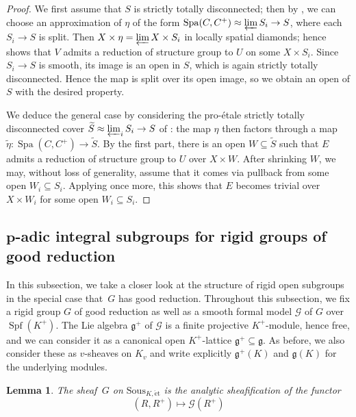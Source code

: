 \documentclass[10pt,a4paper]{article}
\newtheorem{Lemma}[thm]{Lemma}
\theoremstyle{definition}
\theoremstyle{remark}
\newcommand{\Spa}{\operatorname{Spa}}
\newcommand{\et}{{\operatorname{\acute{e}t}}}
\newcommand{\Spf}{\operatorname{Spf}}
\newcommand{\mG}{\mathcal{G}}
\newcommand{\Sous}{\mathrm{Sous}}
\numberwithin{equation}{section}
\begin{document}
\begin{proof}
	We first assume that $S$ is strictly totally disconnected; then by , we can choose an approximation of $\eta$ of the form $\Spa(C,C^+)\approx \varprojlim S_i\to S$, where each $S_i\to S$ is split. Then $X\times \eta= \varprojlim X\times S_i$ in locally spatial diamonds; hence  shows that $V$ admits a reduction of structure group to $U$ on some $X\times S_i$. Since $S_i\to S$ is smooth, its image is an open in $S$, which is again strictly totally disconnected. Hence the map is split over its open image, so we obtain an open of $S$ with the desired property.
	
	We deduce the general case by considering the pro-\'etale strictly totally disconnected cover $\widetilde{S}\approx\varprojlim_i S_i\to S$ of : the map $\eta$ then factors through a map $\widetilde{\eta}\colon \Spa(C,C^+)\to \widetilde{S}$. By the first part, there is an open $W\subseteq \widetilde{S}$ such that $E$ admits a reduction of structure group to $U$ over $X\times W$. After shrinking $W$, we may, without loss of generality, assume that it comes via pullback from some open $W_i\subseteq S_i$. Applying  once more, this shows that $E$ becomes trivial over $X\times W_i$ for some open $W_i\subseteq S_i$.
\end{proof}

\subsection{$\boldsymbol{p}$-adic integral subgroups for rigid groups of good reduction }\label{s:integral-G}
In this subsection, we take a closer look at the structure of rigid open subgroups in the special case that~$G$ has good reduction.
Throughout this subsection, we fix a rigid group $G$ of good reduction as well as a smooth formal model $\mathcal G$ of $G$ over $\Spf(K^+)$. The Lie algebra $\mathfrak g^+$ of $\mathcal G$ is a finite projective $K^+$-module, hence free, and we can consider it as a canonical open $K^+$-lattice $\mathfrak g^+\subseteq \mathfrak g$. As before, we also consider these as $v$-sheaves on $K_v$ and write explicitly  $\mathfrak g^+(K)$ and $\mathfrak g(K)$ for the underlying  modules. 

\begin{Lemma}
	The sheaf\, $G$ on $\Sous_{K,\et}$ is the analytic sheafification of the functor 
	\[ (R,R^+)\longmapsto \mG(R^+)\]
\end{Lemma}
\end{document}
